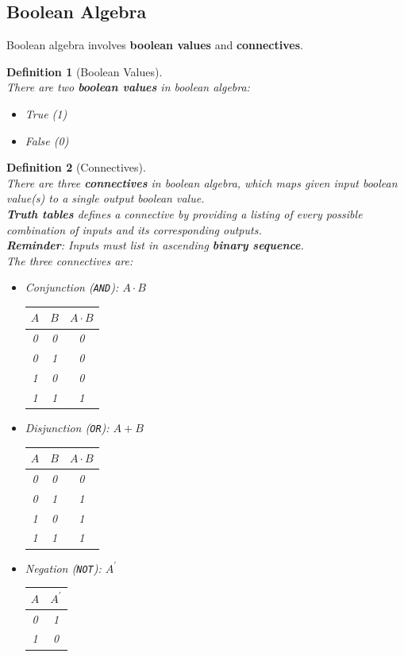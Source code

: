 \documentclass[12pt]{article}
\newtheorem{definition}{Definition}[section]
\theoremstyle{definition}
\begin{document}
\subsection{Boolean Algebra}
Boolean algebra involves \textbf{boolean values} and \textbf{connectives}.
\begin{definition}[Boolean Values]
\hfill\\\normalfont There are \textit{two} \textbf{boolean values} in boolean algebra:
\begin{itemize}
  \item True (1)
  \item False (0)
\end{itemize}
\end{definition}
\begin{definition}[Connectives]
\hfill\\\normalfont There are \textit{three} \textbf{connectives} in boolean algebra, which maps given input boolean value(s) to a single output boolean value.\\
\textbf{Truth tables} defines a connective by providing a listing of every possible combination of inputs and its corresponding outputs.\\
\textbf{Reminder}: Inputs must list in \textit{ascending} \textbf{binary sequence}.\\
The three connectives are:\clearpage
\begin{itemize}
\item Conjunction (\texttt{AND}): $A \cdot B$
\begin{table}[h]
\centering
\begin{tabular}{|c|c|c|}
\hline
$A$ & $B$ & $A\cdot B$
\\\hline
0 & 0 & 0
\\\hline
0 & 1 & 0
\\\hline
1 & 0 & 0
\\\hline
1 & 1 & 1
\\\hline
\end{tabular}
\end{table}
\item Disjunction (\texttt{OR}): $A+B$
\begin{table}[h]
\centering
\begin{tabular}{|c|c|c|}
\hline
$A$ & $B$ & $A\cdot B$
\\\hline
0 & 0 & 0
\\\hline
0 & 1 & 1
\\\hline
1 & 0 & 1
\\\hline
1 & 1 & 1
\\\hline
\end{tabular}
\end{table}
\item Negation (\texttt{NOT}): $A^\prime$
\begin{table}[h]
\centering
\begin{tabular}{|c|c|}
\hline
$A$ & $A^\prime$
\\\hline
0 & 1
\\\hline
1 & 0
\\\hline
\end{tabular}
\end{table}
\end{itemize}
\end{definition}
\end{document}
